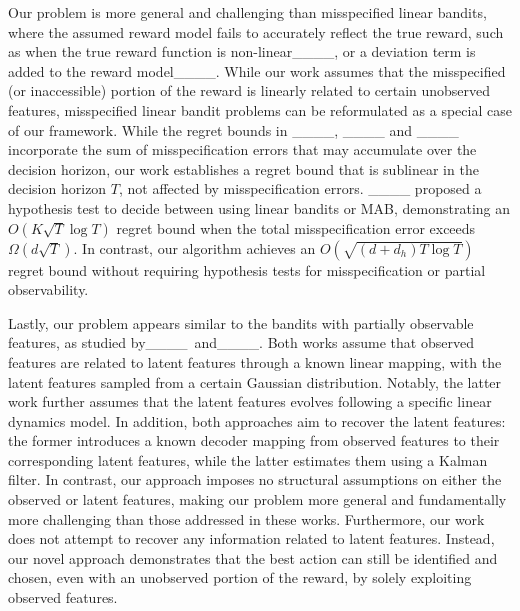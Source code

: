 Our problem is more general and challenging than misspecified linear bandits, where the assumed reward model fails to accurately reflect the true reward, such as when the true reward function is non-linear____, or a deviation term is added to the reward model____. 
While our work assumes that the misspecified (or inaccessible) portion of the reward is linearly related to certain unobserved features, misspecified linear bandit problems can be reformulated as a special case of our framework.
While the regret bounds in ____, ____ and ____ incorporate the sum of misspecification errors that may accumulate over the decision horizon, our work establishes a regret bound that is sublinear in the decision horizon $T$, not affected by misspecification errors.
____ proposed a hypothesis test to decide between using linear bandits or MAB, demonstrating an $O(K\sqrt{T}\log T)$ regret bound when the total misspecification error exceeds $\Omega(d\sqrt{T})$.
In contrast, our algorithm achieves an $O(\sqrt{(d+d_h)T \log T})$ regret bound without requiring hypothesis tests for misspecification or partial observability.

Lastly, our problem appears similar to the bandits with partially observable features, as studied by____~and____.
Both works assume that observed features are related to latent features through a known linear mapping, with the latent features sampled from a certain Gaussian distribution. 
Notably, the latter work further assumes that the latent features evolves following a specific linear dynamics model.
In addition, both approaches aim to recover the latent features: the former introduces a known decoder mapping from observed features to their corresponding latent features, while the latter estimates them using a Kalman filter.
In contrast, our approach imposes no structural assumptions on either the observed or latent features, making our problem more general and fundamentally more challenging than those addressed in these works.
Furthermore, our work does not attempt to recover any information related to latent features.
Instead, our novel approach demonstrates that the best action can still be identified and chosen, even with an unobserved portion of the reward, by solely exploiting observed features.